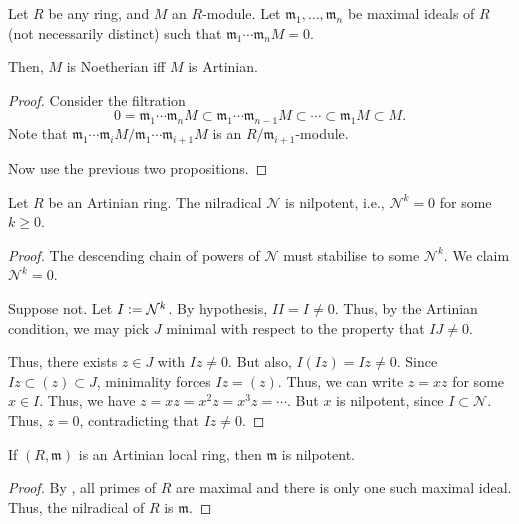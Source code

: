 \documentclass[12pt]{article}
\begin{document}
\begin{cor} \label{cor:annihilated-maximals-artinian-noetherian}
	Let $R$ be any ring, and $M$ an $R$-module. Let $\mathfrak{m}_{1}, \ldots, \mathfrak{m}_{n}$ be maximal ideals of $R$ (not necessarily distinct) such that $\mathfrak{m}_{1} \cdots \mathfrak{m}_{n} M = 0$.

	Then, $M$ is Noetherian iff $M$ is Artinian.
\end{cor}
\begin{proof} 
	Consider the filtration
	\begin{equation*} 
		0 = \mathfrak{m}_{1} \cdots \mathfrak{m}_{n} M \subset \mathfrak{m}_{1} \cdots \mathfrak{m}_{n - 1} M \subset \cdots \subset \mathfrak{m}_{1} M \subset M.
	\end{equation*}
	Note that $\mathfrak{m}_{1} \cdots \mathfrak{m}_{i} M/\mathfrak{m}_{1} \cdots \mathfrak{m}_{i + 1} M$ is an $R/\mathfrak{m}_{i + 1}$-module. 

	Now use the previous two propositions.
\end{proof}

\begin{prop}
	Let $R$ be an Artinian ring. The nilradical $\mathcal{N}$ is nilpotent, i.e., $\mathcal{N}^{k} = 0$ for some $k \ge 0$.
\end{prop}
\begin{proof} 
	The descending chain of powers of $\mathcal{N}$ must stabilise to some $\mathcal{N}^{k}$. We claim $\mathcal{N}^{k} = 0$. 

	Suppose not. Let $I \vcentcolon= \mathcal{N}^{k}$. By hypothesis, $I I = I \neq 0$. Thus, by the Artinian condition, we may pick $J$ minimal with respect to the property that $IJ \neq 0$.

	Thus, there exists $z \in J$ with $Iz \neq 0$. But also, $I(Iz) = Iz \neq 0$. \newline
	Since $Iz \subset (z) \subset J$, minimality forces $Iz = (z)$. Thus, we can write $z = xz$ for some $x \in I$. Thus, we have $z = xz = x^{2} z = x^{3} z = \cdots$. \newline
	But $x$ is nilpotent, since $I \subset \mathcal{N}$. Thus, $z = 0$, contradicting that $Iz \neq 0$.
\end{proof}

\begin{cor} \label{cor:artin-local-nilpotent-maximal}
	If $(R, \mathfrak{m})$ is an Artinian local ring, then $\mathfrak{m}$ is nilpotent.
\end{cor}
\begin{proof} 
	By , all primes of $R$ are maximal and there is only one such maximal ideal. Thus, the nilradical of $R$ is $\mathfrak{m}$.
\end{proof}
\end{document}
